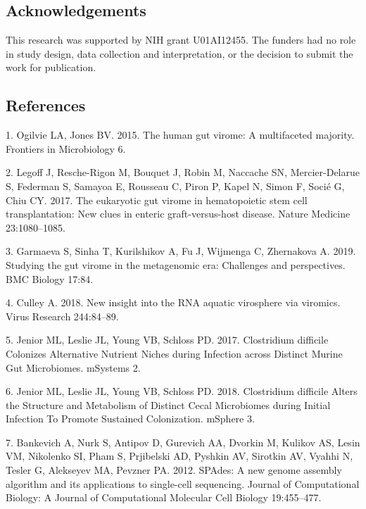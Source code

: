 \documentclass[11pt,]{article}
\begin{document}
\hypertarget{acknowledgements}{%
\subsection{Acknowledgements}\label{acknowledgements}}

This research was supported by NIH grant U01AI12455. The funders had no
role in study design, data collection and interpretation, or the
decision to submit the work for publication.

\newpage

\hypertarget{references}{%
\subsection{References}\label{references}}

\hypertarget{refs}{}
\leavevmode\hypertarget{ref-ogilvie_human_2015}{}%
1. Ogilvie LA, Jones BV. 2015. The human gut virome: A multifaceted
majority. Frontiers in Microbiology 6.

\leavevmode\hypertarget{ref-legoff_eukaryotic_2017}{}%
2. Legoff J, Resche-Rigon M, Bouquet J, Robin M, Naccache SN,
Mercier-Delarue S, Federman S, Samayoa E, Rousseau C, Piron P, Kapel N,
Simon F, Socié G, Chiu CY. 2017. The eukaryotic gut virome in
hematopoietic stem cell transplantation: New clues in enteric
graft-versus-host disease. Nature Medicine 23:1080--1085.

\leavevmode\hypertarget{ref-garmaeva_studying_2019}{}%
3. Garmaeva S, Sinha T, Kurilshikov A, Fu J, Wijmenga C, Zhernakova A.
2019. Studying the gut virome in the metagenomic era: Challenges and
perspectives. BMC Biology 17:84.

\leavevmode\hypertarget{ref-culley_new_2018}{}%
4. Culley A. 2018. New insight into the RNA aquatic virosphere via
viromics. Virus Research 244:84--89.

\leavevmode\hypertarget{ref-jenior_clostridium_2017}{}%
5. Jenior ML, Leslie JL, Young VB, Schloss PD. 2017. Clostridium
difficile Colonizes Alternative Nutrient Niches during Infection across
Distinct Murine Gut Microbiomes. mSystems 2.

\leavevmode\hypertarget{ref-jenior_clostridium_2018}{}%
6. Jenior ML, Leslie JL, Young VB, Schloss PD. 2018. Clostridium
difficile Alters the Structure and Metabolism of Distinct Cecal
Microbiomes during Initial Infection To Promote Sustained Colonization.
mSphere 3.

\leavevmode\hypertarget{ref-bankevich_spades:_2012}{}%
7. Bankevich A, Nurk S, Antipov D, Gurevich AA, Dvorkin M, Kulikov AS,
Lesin VM, Nikolenko SI, Pham S, Prjibelski AD, Pyshkin AV, Sirotkin AV,
Vyahhi N, Tesler G, Alekseyev MA, Pevzner PA. 2012. SPAdes: A new genome
assembly algorithm and its applications to single-cell sequencing.
Journal of Computational Biology: A Journal of Computational Molecular
Cell Biology 19:455--477.
\end{document}
